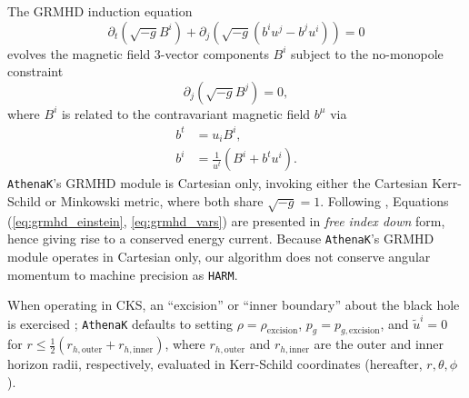 \documentclass[twocolumn, floatfix]{aastex63}
\newcommand{\ak}{\texttt{AthenaK}}
\begin{document}
The GRMHD induction equation
\begin{equation}
    \partial_t \left( \sqrt{-g} B^i \right) + \partial_j \left( \sqrt{-g} \left(b^i u^j - b^j u^i \right) \right) = 0
\end{equation}
evolves the magnetic field 3-vector components $B^i$ subject to the no-monopole constraint
\begin{equation}
    \partial_j \left( \sqrt{-g} B^j \right) = 0,
\end{equation}
where $B^i$ is related to the contravariant magnetic field $b^\mu$ via
\begin{align}
b^t &= u_i B^i, \\
b^i &= \frac{1}{u^t} \left(B^i + b^t u^i \right).
\label{eq:dual_faraday}
\end{align}
\texttt{AthenaK}'s GRMHD module is Cartesian only, invoking either the Cartesian Kerr-Schild \citep[CKS;][]{2007arXiv0706.0622V} or Minkowski metric, where both share $\sqrt{-g} = 1$.  Following \cite{2003ApJ...589..444G}, Equations (\ref{eq:grmhd_einstein}, \ref{eq:grmhd_vars}) are presented in \textit{free index down} form, hence giving rise to a conserved energy current.  Because \ak{}'s GRMHD module operates in Cartesian only, our algorithm does not conserve angular momentum to machine precision as \texttt{HARM}.  

When operating in CKS, an ``excision'' or ``inner boundary'' about the black hole is exercised \citep[c.f.,][]{2021MNRAS.504.6076R, 2019A&A...629A..61O}; \texttt{AthenaK} defaults to setting $\rho = \rho_\mathrm{excision}$, $p_g = p_{g, \mathrm{excision}}$, and $\tilde{u}^i = 0$ for $r \leq \frac{1}{2} \left(r_{h, \mathrm{outer}} + r_{h, \mathrm{inner}} \right)$, where $r_{h, \mathrm{outer}}$ and $r_{h, \mathrm{inner}}$ are the outer and inner horizon radii, respectively, evaluated in Kerr-Schild coordinates (hereafter, $r, \theta, \phi$).
\end{document}
